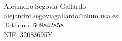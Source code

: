 Alejandro Segovia Gallardo \\ %
alejandro.segoviagallardo@alum.uca.es \\ %
Teléfono: 608842858 \\ %
NIF: 32083695Y \\ %
